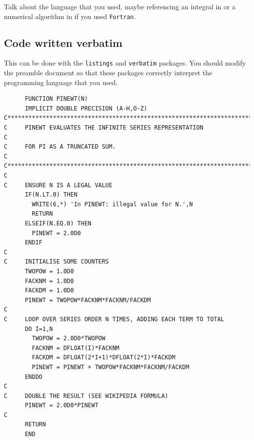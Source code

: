 Talk about the language that you used, maybe referencing an integral in \cite{abramowitz1970} or a numerical algorithm in \cite{press1992} if you used \texttt{Fortran}.

\subsection{Code written verbatim}\label{subsec:verbatim}

This can be done with the \texttt{listings} and \texttt{verbatim} packages. You should modify the preamble document so that these packages correctly interpret the programming language that you used.

\newpage

\begin{lstlisting}
      FUNCTION PINEWT(N)
      IMPLICIT DOUBLE PRECISION (A-H,O-Z)
C**********************************************************************C
C     PINEWT EVALUATES THE INFINITE SERIES REPRESENTATION              C
C     FOR PI AS A TRUNCATED SUM.                                       C
C**********************************************************************C
C
C     ENSURE N IS A LEGAL VALUE
      IF(N.LT.0) THEN
        WRITE(6,*) 'In PINEWT: illegal value for N.',N
        RETURN
      ELSEIF(N.EQ.0) THEN
        PINEWT = 2.0D0
      ENDIF
C
C     INITIALISE SOME COUNTERS
      TWOPOW = 1.0D0
      FACKNM = 1.0D0
      FACKDM = 1.0D0
      PINEWT = TWOPOW*FACKNM*FACKNM/FACKDM
C
C     LOOP OVER SERIES ORDER N TIMES, ADDING EACH TERM TO TOTAL
      DO I=1,N
        TWOPOW = 2.0D0*TWOPOW
        FACKNM = DFLOAT(I)*FACKNM
        FACKDM = DFLOAT(2*I+1)*DFLOAT(2*I)*FACKDM
        PINEWT = PINEWT + TWOPOW*FACKNM*FACKNM/FACKDM
      ENDDO
C
C     DOUBLE THE RESULT (SEE WIKIPEDIA FORMULA)
      PINEWT = 2.0D0*PINEWT
C
      RETURN
      END
\end{lstlisting}